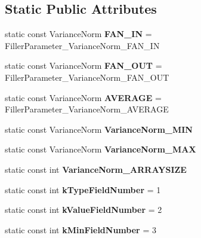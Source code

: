\subsection*{Static Public Attributes}
\begin{DoxyCompactItemize}
\item 
\mbox{\label{classcaffe_1_1_filler_parameter_aea76fecf491aa3896ff2590d28476db0}} 
static const Variance\+Norm {\bfseries F\+A\+N\+\_\+\+IN} = Filler\+Parameter\+\_\+\+Variance\+Norm\+\_\+\+F\+A\+N\+\_\+\+IN
\item 
\mbox{\label{classcaffe_1_1_filler_parameter_a26e365c9832d4d38c87b471d11a24d8c}} 
static const Variance\+Norm {\bfseries F\+A\+N\+\_\+\+O\+UT} = Filler\+Parameter\+\_\+\+Variance\+Norm\+\_\+\+F\+A\+N\+\_\+\+O\+UT
\item 
\mbox{\label{classcaffe_1_1_filler_parameter_a7d814bbbb11e49bd25710b5f461a8b97}} 
static const Variance\+Norm {\bfseries A\+V\+E\+R\+A\+GE} = Filler\+Parameter\+\_\+\+Variance\+Norm\+\_\+\+A\+V\+E\+R\+A\+GE
\item 
static const Variance\+Norm {\bfseries Variance\+Norm\+\_\+\+M\+IN}
\item 
static const Variance\+Norm {\bfseries Variance\+Norm\+\_\+\+M\+AX}
\item 
static const int {\bfseries Variance\+Norm\+\_\+\+A\+R\+R\+A\+Y\+S\+I\+ZE}
\item 
\mbox{\label{classcaffe_1_1_filler_parameter_a6d8758bf0e1e991ff1f1384936f385fa}} 
static const int {\bfseries k\+Type\+Field\+Number} = 1
\item 
\mbox{\label{classcaffe_1_1_filler_parameter_ad276aa2ed40163dd134a61790e4fe23a}} 
static const int {\bfseries k\+Value\+Field\+Number} = 2
\item 
\mbox{\label{classcaffe_1_1_filler_parameter_ab15c7ab888ed443ef4b672ff73caaed2}} 
static const int {\bfseries k\+Min\+Field\+Number} = 3
\item 
\mbox{\label{classcaffe_1_1_filler_parameter_a53d8ae97260f1f551fbac6bfbedcb61d}} 

\end{DoxyCompactItemize}
